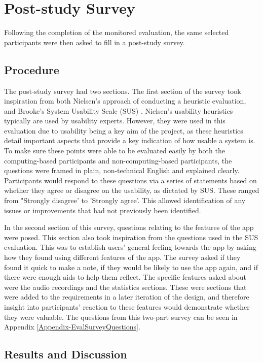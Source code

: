 \documentclass{l4proj}
\begin{document}
\section{Post-study Survey}

Following the completion of the monitored evaluation, the same selected participants were then asked to fill in a post-study survey. 

\subsection{Procedure}

The post-study survey had two sections. The first section of the survey took inspiration from both Nielsen’s approach of conducting a heuristic evaluation, and Brooke's System Usability Scale (SUS) \citep{Nielsen10, affairs_system_2013}. Nielsen's usability heuristics typically are used by usability experts. However, they were used in this evaluation due to usability being a key aim of the project, as these heuristics detail important aspects that provide a key indication of how usable a system is. To make sure these points were able to be evaluated easily by both the computing-based participants and non-computing-based participants, the questions were framed in plain, non-technical English and explained clearly. Participants would respond to these questions via a series of statements based on whether they agree or disagree on the usability, as dictated by SUS. These ranged from "Strongly disagree' to 'Strongly agree'. This allowed identification of any issues or improvements that had not previously been identified. 

In the second section of this survey, questions relating to the features of the app were posed. This section also took inspiration from the questions used in the SUS evaluation. This was to establish users' general feeling towards the app by asking how they found using different features of the app. The survey asked if they found it quick to make a note, if they would be likely to use the app again, and if there were enough aids to help them reflect. The specific features asked about were the audio recordings and the statistics sections. These were sections that were added to the requirements in a later iteration of the design, and therefore insight into participants' reaction to these features would demonstrate whether they were valuable. The questions from this two-part survey can be seen in Appendix \ref{Appendix-EvalSurveyQuestions}.


\subsection{Results and Discussion}
\end{document}
